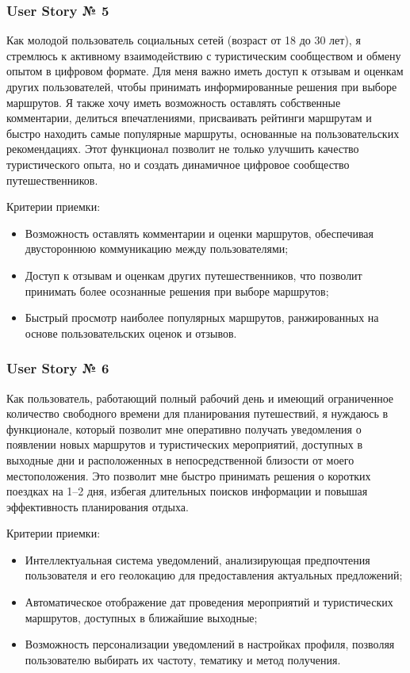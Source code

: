 \subsubsection*{User Story № 5} 
Как молодой пользователь социальных сетей (возраст от 18 до 30 лет), я стремлюсь к активному взаимодействию с туристическим сообществом и обмену опытом в цифровом формате. Для меня важно иметь доступ к отзывам и оценкам других пользователей, чтобы принимать информированные решения при выборе маршрутов. Я также хочу иметь возможность оставлять собственные комментарии, делиться впечатлениями, присваивать рейтинги маршрутам и быстро находить самые популярные маршруты, основанные на пользовательских рекомендациях. Этот функционал позволит не только улучшить качество туристического опыта, но и создать динамичное цифровое сообщество путешественников.

Критерии приемки:
\begin{itemize}
    \item Возможность оставлять комментарии и оценки маршрутов, обеспечивая двустороннюю коммуникацию между пользователями;
    \item Доступ к отзывам и оценкам других путешественников, что позволит принимать более осознанные решения при выборе маршрутов;
    \item Быстрый просмотр наиболее популярных маршрутов, ранжированных на основе пользовательских оценок и отзывов.
\end{itemize}

\subsubsection*{User Story № 6} 
Как пользователь, работающий полный рабочий день и имеющий ограниченное количество свободного времени для планирования путешествий, я нуждаюсь в функционале, который позволит мне оперативно получать уведомления о появлении новых маршрутов и туристических мероприятий, доступных в выходные дни и расположенных в непосредственной близости от моего местоположения. Это позволит мне быстро принимать решения о коротких поездках на 1–2 дня, избегая длительных поисков информации и повышая эффективность планирования отдыха.

Критерии приемки:
\begin{itemize}
    \item Интеллектуальная система уведомлений, анализирующая предпочтения пользователя и его геолокацию для предоставления актуальных предложений;
    \item Автоматическое отображение дат проведения мероприятий и туристических маршрутов, доступных в ближайшие выходные;
    \item Возможность персонализации уведомлений в настройках профиля, позволяя пользователю выбирать их частоту, тематику и метод получения.
\end{itemize}


